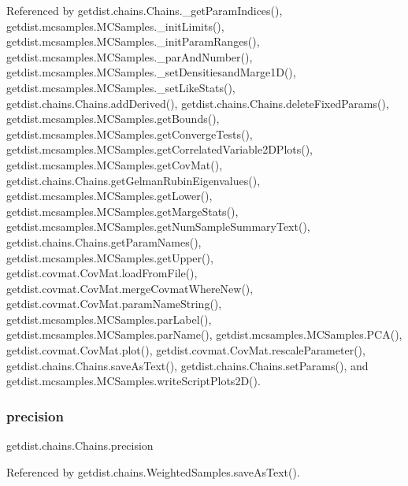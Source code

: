 Referenced by getdist.\+chains.\+Chains.\+\_\+get\+Param\+Indices(), getdist.\+mcsamples.\+M\+C\+Samples.\+\_\+init\+Limits(), getdist.\+mcsamples.\+M\+C\+Samples.\+\_\+init\+Param\+Ranges(), getdist.\+mcsamples.\+M\+C\+Samples.\+\_\+par\+And\+Number(), getdist.\+mcsamples.\+M\+C\+Samples.\+\_\+set\+Densitiesand\+Marge1\+D(), getdist.\+mcsamples.\+M\+C\+Samples.\+\_\+set\+Like\+Stats(), getdist.\+chains.\+Chains.\+add\+Derived(), getdist.\+chains.\+Chains.\+delete\+Fixed\+Params(), getdist.\+mcsamples.\+M\+C\+Samples.\+get\+Bounds(), getdist.\+mcsamples.\+M\+C\+Samples.\+get\+Converge\+Tests(), getdist.\+mcsamples.\+M\+C\+Samples.\+get\+Correlated\+Variable2\+D\+Plots(), getdist.\+mcsamples.\+M\+C\+Samples.\+get\+Cov\+Mat(), getdist.\+chains.\+Chains.\+get\+Gelman\+Rubin\+Eigenvalues(), getdist.\+mcsamples.\+M\+C\+Samples.\+get\+Lower(), getdist.\+mcsamples.\+M\+C\+Samples.\+get\+Marge\+Stats(), getdist.\+mcsamples.\+M\+C\+Samples.\+get\+Num\+Sample\+Summary\+Text(), getdist.\+chains.\+Chains.\+get\+Param\+Names(), getdist.\+mcsamples.\+M\+C\+Samples.\+get\+Upper(), getdist.\+covmat.\+Cov\+Mat.\+load\+From\+File(), getdist.\+covmat.\+Cov\+Mat.\+merge\+Covmat\+Where\+New(), getdist.\+covmat.\+Cov\+Mat.\+param\+Name\+String(), getdist.\+mcsamples.\+M\+C\+Samples.\+par\+Label(), getdist.\+mcsamples.\+M\+C\+Samples.\+par\+Name(), getdist.\+mcsamples.\+M\+C\+Samples.\+P\+C\+A(), getdist.\+covmat.\+Cov\+Mat.\+plot(), getdist.\+covmat.\+Cov\+Mat.\+rescale\+Parameter(), getdist.\+chains.\+Chains.\+save\+As\+Text(), getdist.\+chains.\+Chains.\+set\+Params(), and getdist.\+mcsamples.\+M\+C\+Samples.\+write\+Script\+Plots2\+D().

\mbox{\label{classgetdist_1_1chains_1_1Chains_a3a9919a141e067468589accd54898913}} 
\subsubsection{\texorpdfstring{precision}{precision}}
{\footnotesize\ttfamily getdist.\+chains.\+Chains.\+precision}



Referenced by getdist.\+chains.\+Weighted\+Samples.\+save\+As\+Text().

\mbox{\label{classgetdist_1_1chains_1_1Chains_ae8dd7bf3c841a906ae7d6b3c83326c75}} 
